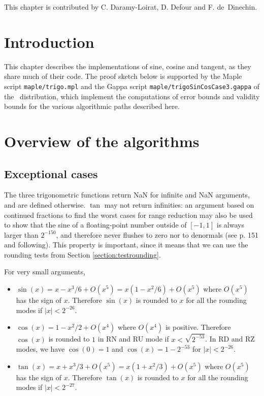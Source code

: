 This chapter is contributed by C. Daramy-Loirat, D. Defour
and F. de~Dinechin.  

\section*{Introduction}
This chapter describes the implementations of sine, cosine and
tangent, as they share much of their code. The proof sketch below is
supported by the Maple script \texttt{maple/trigo.mpl} and the Gappa
script \texttt{maple/trigoSinCosCase3.gappa} of the \crlibm\
distribution, which implement the computations of error bounds and
validity bounds for the various algorithmic paths described here.

\section{Overview of the algorithms}

\subsection{Exceptional cases}

The three trigonometric functions return NaN for infinite and NaN
arguments, and are defined otherwise. $\tan$ may not return
infinities: an argument based on continued fractions to find the worst
cases for range reduction may also be used to show that the sine of a
floating-point number outside of $[-1,1]$ is always larger than
$2^{-150}$, and therefore never flushes to zero nor to denormals (see
\cite{Muller97} p. 151 and following). This property is important,
since it means that we can use the rounding tests from Section
\ref{section:testrounding}.

For very small arguments,
\begin{itemize}
\item $\sin(x) = x-x^3/6 + O(x^5) = x(1-x^2/6) + O(x^5)$ where
  $O(x^5)$ has the sign of $x$. Therefore $\sin(x)$ is rounded to $x$
  for all the rounding  modes if $|x|<2^{-26}$.
\item $\cos(x) = 1-x^2/2 + O(x^4)$ where $O(x^4)$ is positive.
  Therefore $\cos(x)$ is rounded to $1$ in RN and RU mode if
  $x<\sqrt{2^{-53}}$. In RD and RZ modes, we have $\cos(0)=1$ and
  $\cos(x)=1-2^{-53}$ for $|x|<2^{-26}$.
\item $\tan(x) = x+x^3/3 + O(x^5) = x(1+x^2/3) + O(x^5)$ where
  $O(x^5)$ has the sign of $x$. Therefore $\tan(x)$ is rounded to $x$
  for all the rounding  modes if $|x|<2^{-27}$.
\end{itemize}


